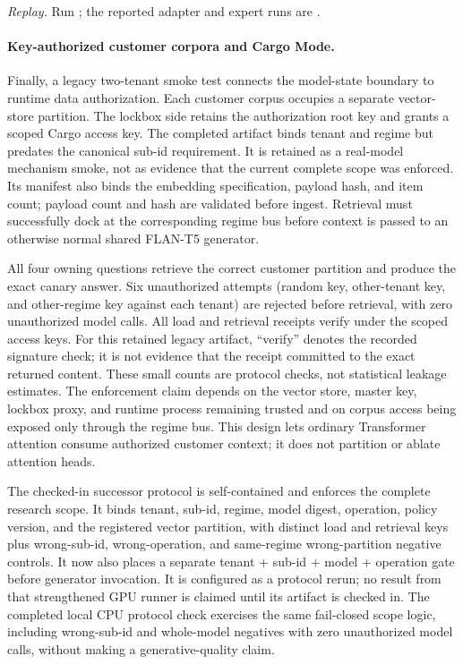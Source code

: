 \documentclass[11pt,a4paper]{article}
\begin{document}
\begin{sloppypar}
\noindent\textit{Replay.} Run
; the reported
adapter and expert runs are
.
\end{sloppypar}

\paragraph{Key-authorized customer corpora and Cargo Mode.}
\label{sec:cargo-transformer}
Finally, a legacy two-tenant smoke test connects the model-state
boundary to runtime data authorization.  Each customer corpus occupies
a separate vector-store partition.  The lockbox side retains the
authorization root key and grants a scoped Cargo access key.  The
completed artifact binds tenant and regime but predates the canonical
sub-id requirement.  It is retained as a real-model mechanism smoke,
not as evidence that the current complete scope was enforced.  Its
manifest also binds the embedding
specification, payload hash, and item count; payload count and hash
are validated before ingest.  Retrieval must successfully dock at the
corresponding regime bus before context is passed to an otherwise
normal shared FLAN-T5 generator.

All four owning questions retrieve the correct customer partition and
produce the exact canary answer.  Six unauthorized attempts
(random key, other-tenant key, and other-regime key against each
tenant) are rejected before retrieval, with zero unauthorized model
calls.  All load and retrieval receipts verify under the scoped access
keys.  For this retained legacy artifact, ``verify'' denotes the recorded
signature check; it is not evidence that the receipt committed to the exact
returned content.  These small counts are protocol checks, not statistical
leakage estimates.  The enforcement claim depends on the vector store, master
key, lockbox proxy, and runtime process remaining trusted and on
corpus access being exposed only through the regime bus.  This design
lets ordinary Transformer attention consume authorized customer
context; it does not partition or ablate attention heads.

The checked-in successor protocol is self-contained and enforces the
complete research scope.  It binds tenant, sub-id, regime, model digest, operation,
policy version, and the registered vector partition, with distinct load
and retrieval keys plus wrong-sub-id, wrong-operation, and same-regime
wrong-partition negative controls.  It now also places a separate
tenant + sub-id + model + operation gate before generator invocation.
It is configured as a protocol rerun; no result from that strengthened
GPU runner is claimed until its artifact is checked in.  The completed
local CPU protocol check exercises the same fail-closed scope logic,
including wrong-sub-id and whole-model negatives with zero unauthorized
model calls, without making a generative-quality claim.
\end{document}

